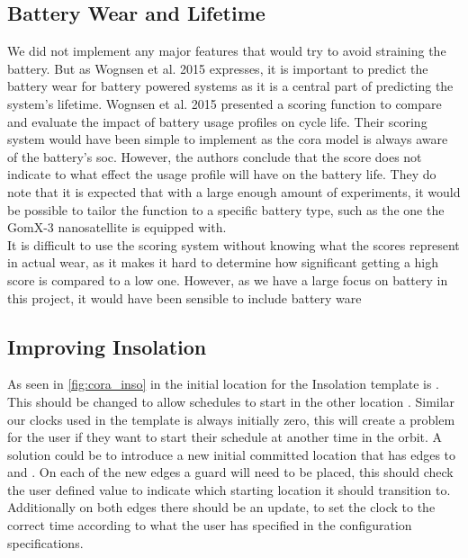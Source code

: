 \subsection{Battery Wear and Lifetime} \label{subsec:disc_life}
We did not implement any major features that would try to avoid straining the battery. 
But as Wognsen et al. 2015\cite{score_function} expresses, it is important to predict the battery wear for battery powered systems as it is a central part of predicting the system's lifetime.
Wognsen et al. 2015\cite{score_function} presented a scoring function to compare and evaluate the impact of battery usage profiles on cycle life. Their scoring system would have been simple to implement as the \gls{cora} model is always aware of the battery's \gls{soc}. However, the authors conclude that the score does not indicate to what effect the usage profile will have on the battery life. They do note that it is expected that with a large enough amount of experiments, it would be possible to tailor the function to a specific battery type, such as the one the GomX-3 nanosatellite is equipped with. \\
It is difficult to use the scoring system without knowing what the scores represent in actual wear, as it makes it hard to determine how significant getting a high score is compared to a low one. However, as we have a large focus on battery in this project, it would have been sensible to include battery ware


\subsection*{Improving Insolation}
As seen in \cref{fig:cora_inso} in  the initial location for the Insolation template is . This should be changed to allow schedules to start in the other location . Similar our clocks used in the template is always initially zero, this will create a problem for the user if they want to start their schedule at another time in the orbit. A solution could be to introduce a new initial committed location that has edges to  and . On each of the new edges a guard will need to be placed, this should check the user defined value to indicate which starting location it should transition to. Additionally on both edges there should be an update, to set the clock to the correct time according to what the user has specified in the configuration specifications.

